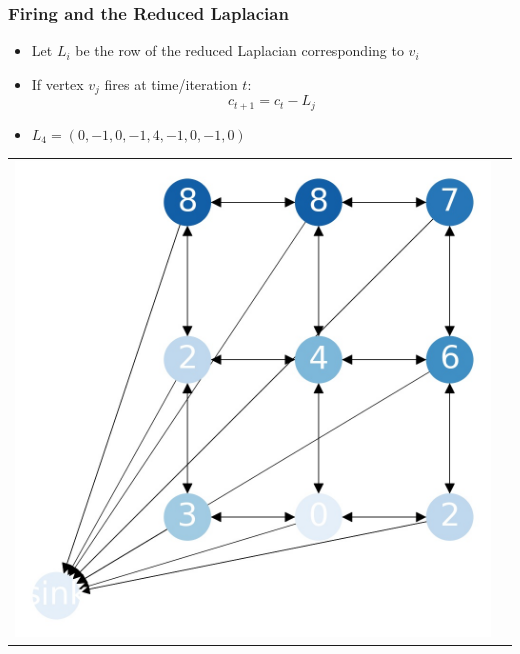 \documentclass{beamer}
\begin{document}
\begin{frame}
\frametitle{Firing and the Reduced Laplacian}

\begin{itemize}
\item Let $L_i$ be the row of the reduced Laplacian corresponding to $v_i$
\item If vertex $v_j$ fires at time/iteration $t$:
\[ c_{t+1} = c_t - L_j \]
\item $L_4 = (0,-1,0,-1,4,-1,0,-1,0)$
\end{itemize}

\begin{tabular}{cc}

  \includegraphics[scale=0.15]{sandpile_12}


\end{tabular}
\end{frame}
\end{document}
